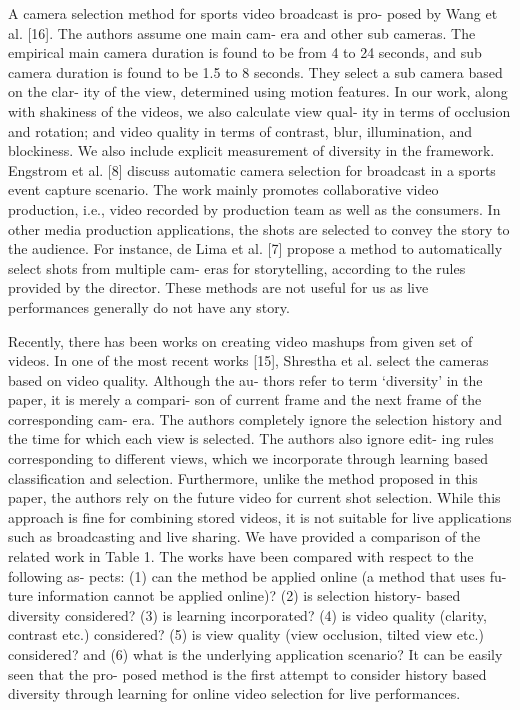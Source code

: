 \documentclass{sig-alternate}
\begin{document}
A camera selection method for sports video broadcast is pro-
posed by Wang et al. [16]. The authors assume one main cam-
era and other sub cameras. The empirical main camera duration is
found to be from 4 to 24 seconds, and sub camera duration is found
to be 1.5 to 8 seconds. They select a sub camera based on the clar-
ity of the view, determined using motion features. In our work,
along with shakiness of the videos, we also calculate view qual-
ity in terms of occlusion and rotation; and video quality in terms
of contrast, blur, illumination, and blockiness. We also include
explicit measurement of diversity in the framework. Engstrom et
al. [8] discuss automatic camera selection for broadcast in a sports
event capture scenario. The work mainly promotes collaborative
video production, i.e., video recorded by production team as well
as the consumers.
In other media production applications, the shots are selected to
convey the story to the audience. For instance, de Lima et al. [7]
propose a method to automatically select shots from multiple cam-
eras for storytelling, according to the rules provided by the director.
These methods are not useful for us as live performances generally
do not have any story.

Recently, there has been works on creating video mashups from
given set of videos. In one of the most recent works [15], Shrestha
et al. select the cameras based on video quality. Although the au-
thors refer to term ‘diversity’ in the paper, it is merely a compari-
son of current frame and the next frame of the corresponding cam-
era. The authors completely ignore the selection history and the
time for which each view is selected. The authors also ignore edit-
ing rules corresponding to different views, which we incorporate
through learning based classification and selection. Furthermore,
unlike the method proposed in this paper, the authors rely on the
future video for current shot selection. While this approach is fine
for combining stored videos, it is not suitable for live applications
such as broadcasting and live sharing.
We have provided a comparison of the related work in Table 1.
The works have been compared with respect to the following as-
pects: (1) can the method be applied online (a method that uses fu-
ture information cannot be applied online)? (2) is selection history-
based diversity considered? (3) is learning incorporated? (4) is
video quality (clarity, contrast etc.) considered? (5) is view quality
(view occlusion, tilted view etc.) considered? and (6) what is the
underlying application scenario? It can be easily seen that the pro-
posed method is the first attempt to consider history based diversity
through learning for online video selection for live performances.
\end{document}
